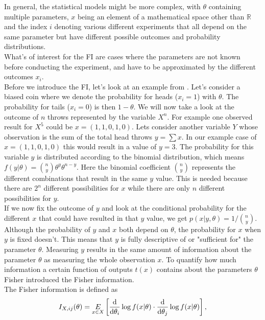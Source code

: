 In general, the statistical models might be more complex, with $\theta$ containing multiple parameters, $x$ being an element of a mathematical space other than $\mathbb{R}$ and the index $i$ denoting various different experiments that all depend on the same parameter but have different possible outcomes and probability distributions.\\
What's of interest for the FI are cases where the parameters are not known before conducting the experiment, and have to be approximated by the different outcomes $x_i$.\\
Before we introduce the FI, let's look at an example from \cite{StatisticFisherInfoTutorial}. Let's consider a biased coin where we denote the probability for heads ($x_i = 1$) with $\theta$. The probability for tails ($x_i = 0$) is then $1-\theta$. We will now take a look at the outcome of $n$ throws represented by the variable $X^n$. For example one observed result for $X^5$ could be $x = (1,1,0,1,0)$. Lets consider another variable $Y$ whose observation is the sum of the total head throws $y = \sum x$. In our example case of $x = (1,1,0,1,0)$ this would result in a value of $y = 3$. The probability for this variable $y$ is distributed according to the binomial distribution, which means $f(y|\theta) = \binom{n}{y}\theta^y \theta^{n-y}$. Here the binomial coefficient $\binom{n}{y}$ represents the different combinations that result in the same $y$ value. This is needed because there are $2^n$ different possibilities for $x$ while there are only $n$ different possibilities for $y$.\\
If we now fix the outcome of $y$ and look at the conditional probability for the different $x$ that could have resulted in that $y$ value, we get $p(x|y,\theta) = 1/ \binom{n}{y}$. Although the probability of $y$ and $x$ both depend on $\theta$, the probability for $x$ when $y$ is fixed doesn't. This means that $y$ is fully descriptive of or "sufficient for" the parameter $\theta$. Measuring $y$ results in the same amount of information about the parameter $\theta$ as measuring the whole observation $x$. To quantify how much information a certain function of outputs $t(x)$ contains about the parameters $\theta$ Fisher introduced the Fisher information.\\
The Fisher information is defined as 
\begin{equation}\label{eq:FIDefinition}
	I_{X,ij}(\theta) = \underset{x\in X}{E} \left[\frac{\mathrm{d}}{\mathrm{d}\theta_i}\log f(x|\theta) \cdot \frac{\mathrm{d}}{\mathrm{d}\theta_j}\log f(x|\theta)\right],
\end{equation}

